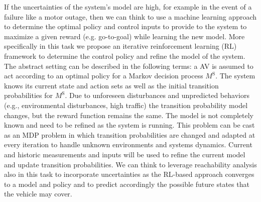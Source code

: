If the uncertainties of the system's model are high, for example in the event of a failure like a motor outage, then we can think to use a machine learning approach to determine the optimal policy and control inputs to provide to the system to maximize a given reward (e.g. go-to-goal) while learning the new model.
More specifically in this task we propose an iterative reinforcement learning (RL) framework to determine the control policy and refine the model of the system. The abstract setting can be described in the following terms: a AV is assumed to act according to an optimal policy for a Markov decision process $M^{\mbox{S}}$. The system knows its current state and action sets as well as the initial transition probabilities for $M^{\mbox{S}}$. Due to unforeseen disturbances and unpredicted behaviors (e.g., environmental disturbances, high traffic) the transition probability model changes, but the reward function remains the same. The model is not completely known and need to be refined as the system is running. This problem can be cast as an MDP problem in which transition probabilities are changed and adapted at every iteration to handle unknown environments and systems dynamics. Current and historic measurements and inputs will be used to refine the current model and update transition probabilities. We can think to leverage reachability analysis also in this task to incorporate uncertainties as the RL-based approach converges to a model and policy and to predict accordingly the possible future states that the vehicle may cover. 


